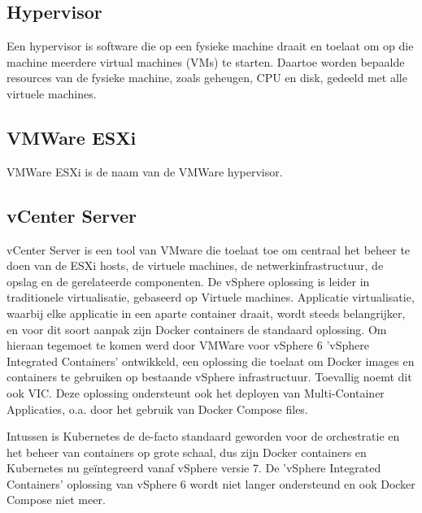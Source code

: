 \textcite{Saelens2023}

\newline
\newline
\subsection{Hypervisor}
Een hypervisor is software die op een fysieke machine draait en toelaat om op die machine meerdere virtual machines (VMs) te starten. Daartoe worden bepaalde resources van de fysieke machine, zoals geheugen, CPU en disk, gedeeld met alle virtuele machines.\textcite{VMware2023a}

\subsection{VMWare ESXi}
VMWare ESXi is de naam van de VMWare hypervisor.\autocite{VMware2023}

\subsection{vCenter Server}
vCenter Server is een tool van VMware die toelaat toe om centraal het beheer te doen van de ESXi hosts, de virtuele machines, de netwerkinfrastructuur, de opslag en de gerelateerde componenten.\autocite{Abbas2023}
\newline
\newline
De vSphere oplossing is leider in traditionele virtualisatie, gebaseerd op Virtuele machines. Applicatie virtualisatie, waarbij elke applicatie in een aparte container draait, wordt steeds belangrijker, en voor dit soort aanpak zijn Docker containers de standaard oplossing. Om hieraan tegemoet te komen werd door VMWare voor vSphere 6 'vSphere Integrated Containers' ontwikkeld, een oplossing die toelaat om Docker images en containers te gebruiken op bestaande vSphere infrastructuur. Toevallig noemt dit ook VIC.
Deze oplossing ondersteunt ook het deployen van Multi-Container Applicaties, o.a. door het gebruik van Docker Compose files.

\textcite{VMware2023b}

\newline
\newline
Intussen is Kubernetes de de-facto standaard geworden voor de orchestratie en het beheer van containers op grote schaal, dus zijn Docker containers en Kubernetes nu geïntegreerd vanaf vSphere versie 7. De 'vSphere Integrated Containers' oplossing van vSphere 6 wordt niet langer ondersteund en ook Docker Compose niet meer.

